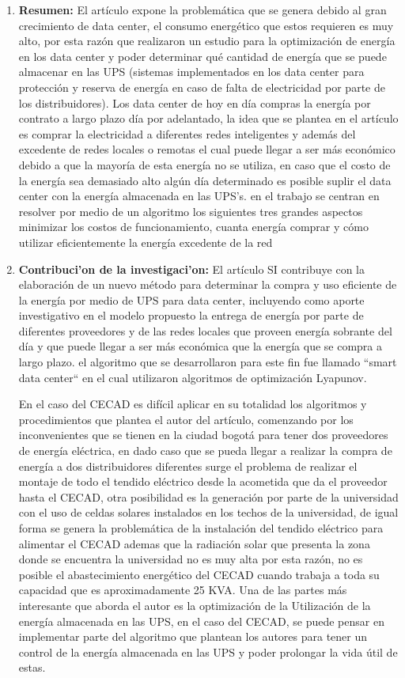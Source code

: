 \documentclass[12pt]{article}
\begin{document}
\begin{enumerate}
	\item  \textbf{Resumen:} El artículo expone la problemática que se genera debido al gran crecimiento de data center, el consumo energético que estos requieren es muy alto, por esta razón que realizaron un estudio para la optimización de energía en los data center y poder determinar qué cantidad de energía que se puede almacenar en las UPS (sistemas implementados en los data center para protección y reserva de energía en caso de falta de electricidad por parte de los distribuidores). Los data center de hoy en día compras la energía por contrato a largo plazo día por adelantado, la idea que se plantea en el artículo es comprar la electricidad a diferentes redes inteligentes y además del excedente de redes locales o remotas el cual puede llegar a ser más económico debido a que la mayoría de esta energía no se utiliza, en caso que el costo de la energía sea demasiado alto algún día determinado es posible suplir el data center con la energía almacenada en las UPS’s. en el trabajo se centran en resolver por medio de un algoritmo los siguientes  tres grandes aspectos minimizar los costos de funcionamiento, cuanta energía comprar y cómo utilizar eficientemente la energía excedente de la red 
	
	\item  \textbf{Contribuci'on de la investigaci'on:} El artículo SI contribuye con la elaboración de un nuevo método para determinar la compra y uso eficiente de la energía por medio de UPS para data center, incluyendo como aporte investigativo en el modelo propuesto la entrega de energía por parte de diferentes proveedores y de las redes locales que proveen energía sobrante del día y que puede llegar a ser más económica que la energía que se compra a largo plazo. el algoritmo que se desarrollaron para este fin fue llamado “smart data center“  en el cual utilizaron algoritmos de optimización Lyapunov.
	
	En el caso del CECAD es difícil  aplicar en su totalidad los algoritmos  y procedimientos que plantea el autor del artículo, comenzando por los inconvenientes que se tienen en la ciudad bogotá para tener dos proveedores de energía eléctrica, en dado caso que se pueda llegar a realizar la compra de energía a dos distribuidores diferentes surge el problema de realizar el montaje de todo el tendido eléctrico desde la acometida que da el proveedor hasta el  CECAD, otra posibilidad es la generación por parte de la universidad con el uso de celdas solares instalados en los techos de la universidad, de igual forma se genera la problemática de la instalación del tendido eléctrico para alimentar el CECAD ademas que la radiación solar que presenta la zona donde se encuentra la universidad no es muy alta por esta razón, no es posible el abastecimiento energético del CECAD cuando trabaja a toda su capacidad que es aproximadamente 25 KVA. Una de las partes más interesante que aborda el autor es la optimización de la Utilización de la energía almacenada en las UPS, en el caso del CECAD, se puede pensar en implementar parte del algoritmo que plantean los autores para tener un control de la energía almacenada en las UPS y poder prolongar la vida útil de estas.  
	

\end{enumerate}
\end{document}
